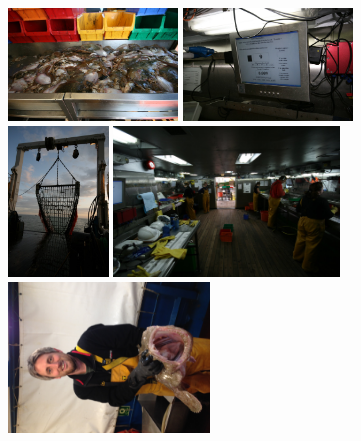 \documentclass[xcolor=x11names,compress]{beamer}
\renewcommand{\(}{\begin{columns}}
\renewcommand{\)}{\end{columns}}
\newcommand{\<}[1]{\begin{column}{#1}}
\renewcommand{\>}{\end{column}}
\begin{document}
\begin{frame}
	\centering
	\includegraphics[height = 3cm]{IMG_9160}
	\includegraphics[height = 3cm]{IMG_9267} \\
	\includegraphics[height = 4cm]{IMG_9192}
	\includegraphics[height = 4cm]{IMG_9279}
	\includegraphics[height = 4cm]{Paul_Dolder}
\end{frame}
\end{document}
